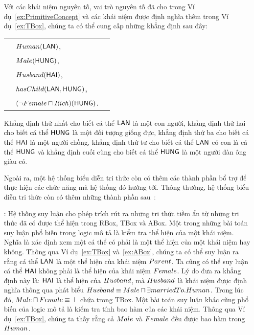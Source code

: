 \begin{Example}\label{ex:ABox}
	Với các khái niệm nguyên tố, vai trò nguyên tố đã cho trong Ví dụ~\ref{ex:PrimitiveConcept} và các khái niệm được định nghĩa thêm trong Ví dụ~\ref{ex:TBox}, chúng ta có thể cung cấp những khẳng định sau đây:\\[1.0ex]
	\begin{tabular}{c l l}
		& $Human(\mathsf{LAN})$, & \\[0.5ex]
		& $Male(\mathsf{HUNG})$, & \\[0.5ex]
		& $Husband(\mathsf{HAI})$, & \\[0.5ex]
		& $hasChild(\mathsf{LAN}, \mathsf{HUNG})$, & \\[0.5ex]
		& $(\neg Female \sqcap Rich)(\mathsf{HUNG})$. &
	\end{tabular}

Khẳng định thứ nhất cho biết cá thể $\mathsf{LAN}$ là một con người, khẳng định thứ hai cho biết cá thể $\mathsf{HUNG}$ là một đối tượng giống đực, khẳng định thứ ba cho biết cá thể $\mathsf{HAI}$ là một người chồng, khẳng định thứ tư cho biết cá thể $\mathsf{LAN}$ có con là cá thể $\mathsf{HUNG}$ và khẳng định cuối cùng cho biết cá thể $\mathsf{HUNG}$ là một người đàn ông giàu có.\myend
\end{Example}

Ngoài ra, một hệ thống biểu diễn tri thức còn có thêm các thành phần bổ trợ để thực hiện các chức năng mà hệ thống đó hướng tới. Thông thường, hệ thống biểu diễn tri thức còn có thêm những thành phần sau~\cite{DLHandbook2007}:

: Hệ thống suy luận cho phép trích rút ra những tri thức tiềm ẩn từ những tri thức đã có được thể hiện trong RBox, TBox và ABox.
%
Một trong những bài toán suy luận phổ biến trong logic mô tả là kiểm tra thể hiện của một khái niệm. Nghĩa là xác định xem một cá thể có phải là một thể hiện của một khái niệm hay không. Thông qua Ví dụ~\ref{ex:TBox} và~\ref{ex:ABox}, chúng ta có thể suy luận ra rằng cá thể $\mathsf{LAN}$ là một thể hiện của khái niệm $Parent$. Ta cũng có thể suy luận cá thể $\mathsf{HAI}$ không phải là thể hiện của khái niệm $Female$. Lý do đưa ra khẳng định này là: $\mathsf{HAI}$ là thể hiện của $Husband$, mà $Husband$ là khái niệm được định nghĩa thông qua phát biểu $Husband \equiv Male \sqcap \exists marriedTo.Human$. Trong lúc đó, $Male \sqcap Female \equiv \bot$ chứa trong TBox.
%
Một bài toán suy luận khác cũng phổ biến của logic mô tả là kiểm tra tính bao hàm của các khái niệm. Thông qua Ví dụ~\ref{ex:TBox}, chúng ta thấy rằng cả $Male$ và $Female$ đều được bao hàm trong $Human$. 
	
